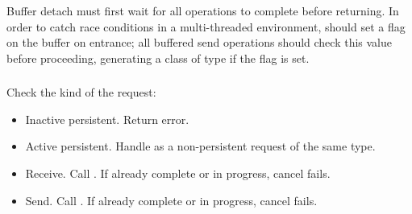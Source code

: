 \documentclass{article}
\begin{document}
\subsubsection{}
Buffer detach must first wait for all operations to complete before
returning.  
In order to catch race conditions in a multi-threaded environment, 
 should set a flag on the buffer on entrance; all
buffered send operations should check this value before proceeding, generating
a  class of type  if the flag is
set.

\subsubsection{}
Check the kind of the request:
\begin{itemize}
\item Inactive persistent.  Return error.
\item Active persistent.  Handle as a non-persistent request of the same type.
\item Receive.  Call .  If already complete
or in progress, cancel fails.   


\item Send. Call .  If already complete or
in progress, cancel fails. 



\end{itemize}
\end{document}

